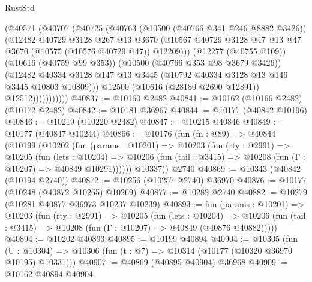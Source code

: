 \begin{lexlean}{RustStd}
\begin{coremodule}
                      (@40571
                        (@40707
                          (@40725
                            (@40763
                              (@10500 (@40766 @341 @246 @8882 @3426))
                              (@12482
                                @40729
                                @3128
                                @267
                                @13
                                @3670
                                (@10567
                                  @40729
                                  @3128
                                  @47
                                  @13
                                  @47
                                  @3670
                                  (@10575 (@10576 @40729 @47))
                                  @12209)))
                            (@12277 (@40755 @109))
                            (@10616 (@40759 @99 @353))
                            (@10500 (@40766 @353 @98 @3679 @3426))
                            (@12482
                              @40334
                              @3128
                              @147
                              @13
                              @3445
                              (@10792 @40334 @3128 @13 @146 @3445 @10803 @10809)))
                          @12500
                          (@10616 (@28180 @2690 @12891))
                          @12512)))))))))))
@40837 := @10160 @2482
@40841 := @10162 (@10166 @2482) (@10172 @2482)
@40842 := @10181 @36967
@40844 := @10177 (@40842 @10196)
@40846 := @10219 (@10220 @2482)
@40847 := @10215 @40846
@40849 := @10177 (@40847 @10244)
@40866 := @10176
    (fun (fn : @89) =>
    @40844
      (@10199
        (@10202
          (fun (params : @10201) =>
          @10203
            (fun (rty : @2991) =>
            @10205
              (fun (lets : @10204) =>
              @10206 (fun (tail : @3415) => @10208 (fun (Γ : @10207) => @40849 @10291))))))
        @10337))
    @2740
@40869 := @10343 (@40842 (@10194 @2740))
@40872 := @10256 (@10257 @2740) @36970
@40876 := @10177 (@10248 (@40872 @10265) @10269)
@40877 := @10282 @2740
@40882 := @10279 (@10281 @40877 @36973 @10237 @10239)
@40893 := fun (params : @10201) =>
  @10203
    (fun (rty : @2991) =>
    @10205
      (fun (lets : @10204) =>
      @10206 (fun (tail : @3415) => @10208 (fun (Γ : @10207) => @40849 (@40876 @40882)))))
@40894 := @10202 @40893
@40895 := @10199 @40894
@40904 := @10305
    (fun (U : @10304) => @10306 (fun (t : @7) => @10314 (@10177 (@10320 @36970 @10195) @10331)))
@40907 := @40869 (@40895 @40904) @36968
@40909 := @10162 @40894 @40904

\end{coremodule}
\end{lexlean}
